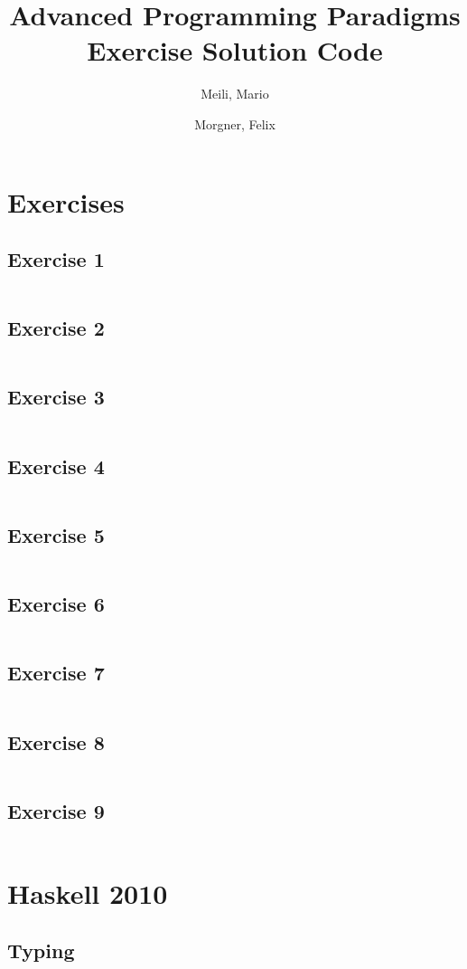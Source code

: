 \documentclass[a4paper,9pt,twoside]{book}
\title{%
Advanced Programming Paradigms\\
\normalsize{Exercise Solution Code}
}
\author{%
  Meili, Mario\\
  \and
  Morgner, Felix
}
\newcommand{\hsfile}[1]{\inputminted[breaklines]{haskell}{../haskell/#1.hs}}
\begin{document}
\maketitle{}
\tableofcontents{}

\chapter{Exercises}
\section{Exercise 1}
\hsfile{ex01/ex01}
\section{Exercise 2}
\hsfile{ex02/ex02}
\section{Exercise 3}
\hsfile{ex03/ex03}
\section{Exercise 4}
\hsfile{ex04/ex04}
\section{Exercise 5}
\hsfile{ex05/ex05}
\section{Exercise 6}
\hsfile{ex06/ex06}
\section{Exercise 7}
\hsfile{ex07/ex07}
\section{Exercise 8}
\hsfile{ex08/ex08}
\section{Exercise 9}
\hsfile{ex09/ex09}
\chapter{Haskell 2010}
\section{Typing}
\hsfile{exam2010/problem_1}
\end{document}
